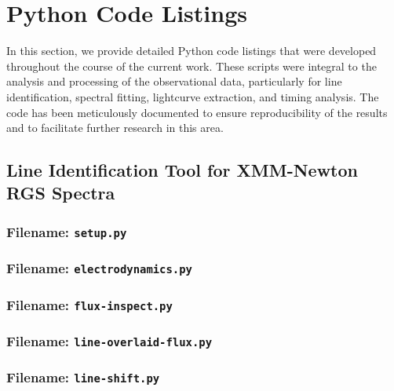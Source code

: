 \chapter{Python Code Listings} \label{appendix:code-listings}
	In this section, we provide detailed Python code listings that were developed throughout the course of the current work. These scripts were integral to the analysis and processing of the observational data, particularly for line identification, spectral fitting, lightcurve extraction, and timing analysis. The code has been meticulously documented to ensure reproducibility of the results and to facilitate further research in this area.

    \section{Line Identification Tool for XMM-Newton RGS Spectra}
		\subsection*{Filename: \texttt{setup.py}}
    	
    	    	
    	\subsection*{Filename: \texttt{electrodynamics.py}}
    	
    	
    	\subsection*{Filename: \texttt{flux-inspect.py}}
    	
    	
    	\subsection*{Filename: \texttt{line-overlaid-flux.py}}
    	
    	
    	\subsection*{Filename: \texttt{line-shift.py}}
    	
    	
